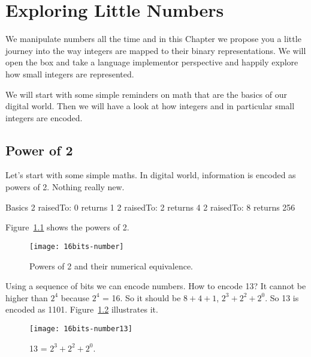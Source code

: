 \documentclass[a4paper,10pt,twoside]{book}
\begin{document}
\fi
\sloppy

\chapter{Exploring Little Numbers}

We manipulate numbers all the time and in this Chapter we propose you a little journey into the way 
integers are mapped to their binary representations. We will open the box and take a language implementor perspective and happily explore how small integers are represented. 

We will start with some simple reminders on math that are the basics of our digital world. Then we will have a look at how integers and in particular small integers are encoded.

\section{Power of 2}

Let's start with some simple maths. In digital world, information is encoded as powers of 2. Nothing really new. 

\begin{code}{Basics}
2 raisedTo: 0
	returns 1
2 raisedTo: 2
	returns 4
2 raisedTo: 8
	returns 256
\end{code}

Figure~\ref{power} shows the powers of 2. 
\begin{figure}[h]
\begin{center}
\texttt{[image: 16bits-number]}
\caption{Powers of 2 and their numerical equivalence.\label{power}}
\end{center}
\end{figure}

Using a sequence of bits we can encode numbers. How to encode 13? It cannot be higher than $2^{4}$ because $2^{4}$ = 16. So it should be $8 + 4 + 1$, $2^{3} + 2^{2} + 2^{0}$. So 13 is encoded as 1101.  Figure~\ref{16bits-number13} illustrates it.

\begin{figure}[h]
\begin{center}
\texttt{[image: 16bits-number13]}
\caption{13 = $2^{3} + 2^{2} + 2^{0}$.\label{16bits-number13}}
\end{center}
\end{figure}
\end{document}
